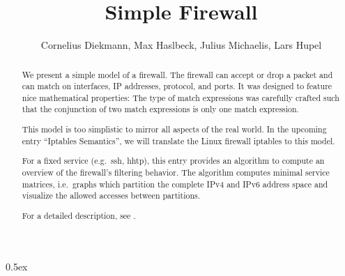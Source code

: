 \documentclass[11pt,a4paper]{article}
\begin{document}
\title{Simple Firewall}
\author{Cornelius Diekmann, Max Haslbeck, Julius Michaelis, Lars Hupel}
\maketitle

\begin{abstract}  
  We present a simple model of a firewall. 
  The firewall can accept or drop a packet and can match on interfaces, IP addresses, protocol, and ports. 
  It was designed to feature nice mathematical properties: 
  The type of match expressions was carefully crafted such that the conjunction of two match expressions is only one match expression. 
  
  This model is too simplistic to mirror all aspects of the real world. 
  In the upcoming entry ``Iptables Semantics'', we will translate the Linux firewall iptables to this model. 
  
  For a fixed service (e.g.\ ssh, hhtp), this entry provides an algorithm to compute an overview of the firewall's filtering behavior. 
  The algorithm computes minimal service matrices, i.e.\ graphs which partition the complete IPv4 and IPv6 address space and visualize the allowed accesses between partitions. 

For a detailed description, see \cite{diekmann2016networking}. 
\end{abstract}

\tableofcontents

\parindent 0pt\parskip 0.5ex





\end{document}
